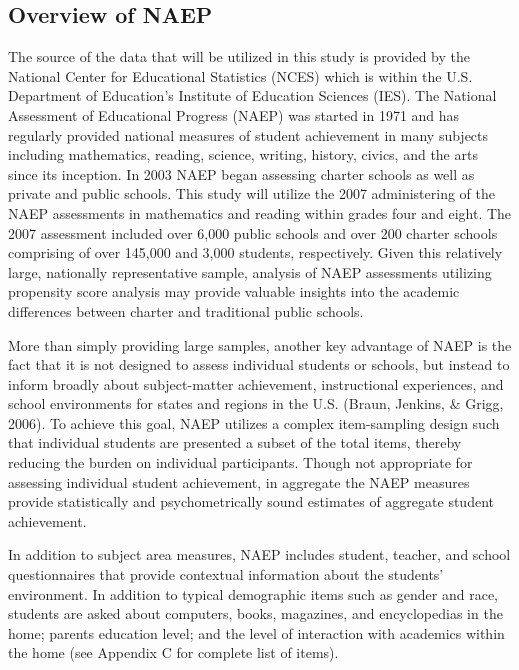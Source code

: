 \documentclass[letterpaper,12pt]{article}
\begin{document}
\subsection{Overview of NAEP}
The source of the data that will be utilized in this study is provided by the National Center for Educational Statistics (NCES) which is within the U.S. Department of Education's Institute of Education Sciences (IES). The National Assessment of Educational Progress (NAEP) was started in 1971 and has regularly provided national measures of student achievement in many subjects including mathematics, reading, science, writing, history, civics, and the arts since its inception. In 2003 NAEP began assessing charter schools as well as private and public schools. This study will utilize the 2007 administering of the NAEP assessments in mathematics and reading within grades four and eight. The 2007 assessment included over 6,000 public schools and over 200 charter schools comprising of over 145,000 and 3,000 students, respectively. Given this relatively large, nationally representative sample, analysis of NAEP assessments utilizing propensity score analysis may provide valuable insights into the academic differences between charter and traditional public schools.

More than simply providing large samples, another key advantage of NAEP is the fact that it is not designed to assess individual students or schools, but instead to inform broadly about subject-matter achievement, instructional experiences, and school environments for states and regions in the U.S. (Braun, Jenkins, \& Grigg, 2006). To achieve this goal, NAEP utilizes a complex item-sampling design such that individual students are presented a subset of the total items, thereby reducing the burden on individual participants. Though not appropriate for assessing individual student achievement, in aggregate the NAEP measures provide statistically and psychometrically sound estimates of aggregate student achievement.

In addition to subject area measures, NAEP includes student, teacher, and school questionnaires that provide contextual information about the students' environment. In addition to typical demographic items such as gender and race, students are asked about computers, books, magazines, and encyclopedias in the home; parents education level; and the level of interaction with academics within the home (see Appendix C for complete list of items).
\end{document}
